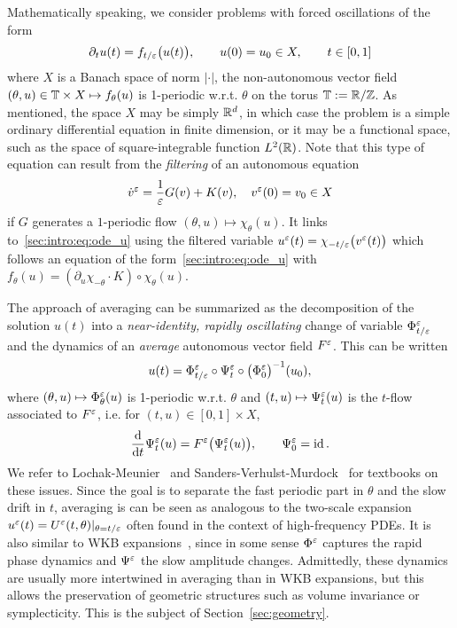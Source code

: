 Mathematically speaking, we consider problems with forced oscillations of
the form 
\begin{equation} \label{sec:intro:eq:ode_u}
  \partial_t u(t) = f_{t/\varepsilon}\big( u(t) \big) , 
  \qquad 
  u(0) = u_0 \in X, 
  \qquad
  t \in [0, 1] 
\end{equation}
where \( X \) is a Banach space of norm \( | \cdot | \), the
non-autonomous vector field \( (\theta,u) \in \mathbb{T} \times X \mapsto
f_\theta(u) \) is 1-periodic w.r.t. \( \theta \) on the torus \( \mathbb{T} :=
\mathbb{R}/\mathbb{Z} \). As mentioned, the space \(X\) may be simply \( \mathbb{R}^d \), in which
case the problem is a simple ordinary differential equation in finite
dimension, or it may be a functional space, such as the space of
square-integrable function \( L^2(\mathbb{R}) \). 
%
Note that this type of equation can result from the \textit{filtering} of
an autonomous equation
\begin{equation} \label{sec:intro:eq:ode_auto}
  \dot v^{\varepsilon} = \frac{1}{\varepsilon} G(v) + K(v), \quad v^{\varepsilon}(0)=v_0 \in X
\end{equation}
if $G$ generates a $1$-periodic flow $(\theta, u) \mapsto \chi_\theta(u)$.
It links to~\ref{sec:intro:eq:ode_u} using the filtered variable 
$u^{\varepsilon}(t) = \chi_{-t/\varepsilon}\big(v^{\varepsilon}(t) \big)$ which
follows an equation of the form~\eqref{sec:intro:eq:ode_u} with
$f_{\theta}(u) = \left(\partial_u \chi_{-\theta}\cdot K \right) \circ
\chi_{\theta}(u)$. 

%

The approach of averaging can be summarized as the decomposition of the
solution \( u(t) \) into a \textit{near-identity, rapidly oscillating}
change of variable \(\Phi^{\varepsilon}_{t/\varepsilon} \) and the dynamics of an
\textit{average} autonomous vector field \( F^{\varepsilon} \). This can be written
\begin{equation} \label{sec:intro:eq:decomp_u}
  u(t) = \Phi^{\varepsilon}_{t/\varepsilon} \circ \Psi^{\varepsilon}_t \circ 
    \big( \Phi^{\varepsilon}_0 \big)^{-1} (u_0), 
\end{equation}
where \( (\theta,u) \mapsto \Phi^{\varepsilon}_\theta(u) \) is 1-periodic w.r.t.
\( \theta \) and \( (t,u) \mapsto \Psi^{\varepsilon}_t(u) \) is the $t$-flow
associated to \( F^{\varepsilon} \), i.e. for $(t,u) \in [0,1] \times X$, 
\begin{equation}
  \frac{\mathrm{d}}{\mathrm{d} t} \Psi^{\varepsilon}_t(u) = F^{\varepsilon} \big( \Psi^{\varepsilon}_t(u) \big) ,
  \qquad \Psi^{\varepsilon}_0 = \operatorname{id} . 
\end{equation}
We refer to Lochak-Meunier~\cite{lochak.1988.multiphase} and
Sanders-Verhulst-Murdock~\cite{sanders.2007.averaging} for textbooks on
these issues. Since the goal is to separate the fast periodic part in
$\theta$ and the slow drift in $t$, averaging is can be seen as analogous
to the two-scale expansion $u^{\varepsilon}(t) = U^{\varepsilon}(t, \theta) |_{\theta =
t/\varepsilon}$ often found in the context of high-frequency PDEs. It
is also similar to WKB expansions~\cite{wentzel.1926.eine,kramers.1926.wellenmechanik,brillouin.1926.remarques}, since in some sense $\Phi^{\varepsilon}$
captures the rapid phase dynamics and $\Psi^{\varepsilon}$ the slow amplitude
changes. Admittedly, these dynamics are usually more intertwined in
averaging than in WKB expansions, but this allows the preservation of
geometric structures such as volume invariance or symplecticity. This is
the subject of Section~\ref{sec:geometry}.

